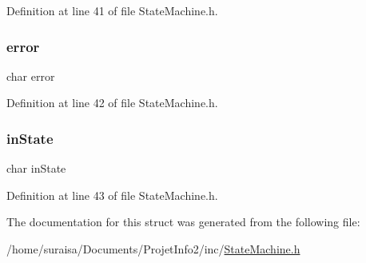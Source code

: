 Definition at line 41 of file State\+Machine.\+h.

\mbox{\label{struct_s_t_a_t_e_m_a_c_h_i_n_e_a1b39a1a9b9888563c380903bcba6ecf4}} 
\subsubsection{\texorpdfstring{error}{error}}
{\footnotesize\ttfamily char error}



Definition at line 42 of file State\+Machine.\+h.

\mbox{\label{struct_s_t_a_t_e_m_a_c_h_i_n_e_a3c3253f225f622698d3c4b407d0b262b}} 
\subsubsection{\texorpdfstring{in\+State}{inState}}
{\footnotesize\ttfamily char in\+State}



Definition at line 43 of file State\+Machine.\+h.



The documentation for this struct was generated from the following file\+:\begin{DoxyCompactItemize}
\item 
/home/suraisa/\+Documents/\+Projet\+Info2/inc/\hyperlink{_state_machine_8h}{State\+Machine.\+h}\end{DoxyCompactItemize}
